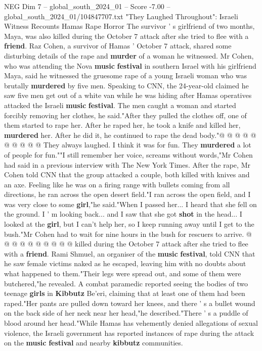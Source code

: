 \begin{textsample}{NEG Dim 7 – global\_south\_2024\_01 – Score -7.00 – global\_south\_2024\_01/104847707.txt}  \label{ex:f7_neg_403}
"They Laughed Throughout": Israeli Witness Recounts Hamas Rape Horror The survivor ' s girlfriend of two months, Maya, was also killed during the October 7 attack after she tried to flee with a \textbf{friend}.
Raz Cohen, a survivor of Hamas ' October 7 attack, shared some disturbing details of the rape and \textbf{murder} of a woman he witnessed.
Mr Cohen, who was attending the Nova \textbf{music} \textbf{festival} in southern Israel with his girlfriend Maya, said he witnessed the gruesome rape of a young Israeli woman who was brutally \textbf{murdered} by five men.
Speaking to CNN, the 24-year-old claimed he saw five men get out of a white van while he was hiding after Hamas operatives attacked the Israeli \textbf{music} \textbf{festival}.
The men caught a woman and started forcibly removing her clothes, he said."After they pulled the clothes off, one of them started to rape her.
After he raped her, he took a knife and killed her, \textbf{murdered} her.
After he did it, he continued to rape the dead body."@ @ @ @ @ @ @ @ @ @ They always laughed.
I think it was for fun.
They \textbf{murdered} a lot of people for fun.""I still remember her voice, screams without words,"Mr Cohen had said in a previous interview with The New York Times.
After the rape, Mr Cohen told CNN that the group attacked a couple, both killed with knives and an axe.
Feeling like he was on a firing range with bullets coming from all directions, he ran across the open desert field."I ran across the open field, and I was very close to some \textbf{girl},"he said."When I passed her...
I heard that she fell on the ground.
I ' m looking back... and I saw that she got \textbf{shot} in the head...
I looked at the \textbf{girl}, but I can't help her, so I keep running away until I get to the bush."Mr Cohen had to wait for nine hours in the bush for rescuers to arrive. @ @ @ @ @ @ @ @ @ @ killed during the October 7 attack after she tried to flee with a \textbf{friend}.
Rami Shmuel, an organiser of the \textbf{music} \textbf{festival}, told CNN that he saw female victims naked as he escaped, leaving him with no doubts about what happened to them."Their legs were spread out, and some of them were butchered,"he revealed.
A combat paramedic reported seeing the bodies of two teenage \textbf{girls} in \textbf{Kibbutz} Be'eri, claiming that at least one of them had been raped."Her pants are pulled down toward her knees, and there ' s a bullet wound on the back side of her neck near her head,"he described."There ' s a puddle of blood around her head."While Hamas has vehemently denied allegations of sexual violence, the Israeli government has reported instances of rape during the attack on the \textbf{music} \textbf{festival} and nearby \textbf{kibbutz} communities.

\end{textsample}
